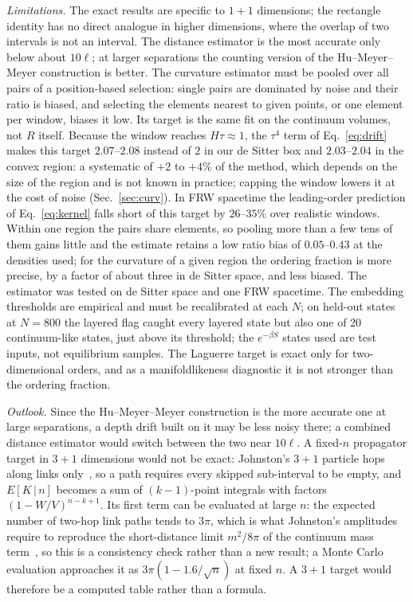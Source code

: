 \documentclass[prd,twocolumn,superscriptaddress,nofootinbib,amsmath,amssymb,floatfix]{revtex4-2}
\begin{document}
\emph{Limitations.} The exact results are specific to $1+1$ dimensions; the rectangle identity has no direct analogue in higher dimensions, where the overlap of two intervals is not an interval. The distance estimator is the most accurate only below about $10\ell$; at larger separations the counting version of the Hu--Meyer--Meyer construction is better. The curvature estimator must be pooled over all pairs of a position-based selection: single pairs are dominated by noise and their ratio is biased, and selecting the elements nearest to given points, or one element per window, biases it low. Its target is the same fit on the continuum volumes, not $R$ itself. Because the window reaches $H\tau\approx1$, the $\tau^4$ term of Eq.~\eqref{eq:drift} makes this target $2.07$--$2.08$ instead of $2$ in our de Sitter box and $2.03$--$2.04$ in the convex region: a systematic of $+2$ to $+4\%$ of the method, which depends on the size of the region and is not known in practice; capping the window lowers it at the cost of noise (Sec.~\ref{sec:curv}). In FRW spacetime the leading-order prediction of Eq.~\eqref{eq:kernel} falls short of this target by $26$--$35\%$ over realistic windows. Within one region the pairs share elements, so pooling more than a few tens of them gains little and the estimate retains a low ratio bias of $0.05$--$0.43$ at the densities used; for the curvature of a given region the ordering fraction is more precise, by a factor of about three in de Sitter space, and less biased. The estimator was tested on de Sitter space and one FRW spacetime. The embedding thresholds are empirical and must be recalibrated at each $N$; on held-out states at $N=800$ the layered flag caught every layered state but also one of 20 continuum-like states, just above its threshold; the $e^{-\beta S}$ states used are test inputs, not equilibrium samples. The Laguerre target is exact only for two-dimensional orders, and as a manifoldlikeness diagnostic it is not stronger than the ordering fraction.

\emph{Outlook.} Since the Hu--Meyer--Meyer construction is the more accurate one at large separations, a depth drift built on it may be less noisy there; a combined distance estimator would switch between the two near $10\ell$. A fixed-$n$ propagator target in $3+1$ dimensions would not be exact: Johnston's $3+1$ particle hops along links only~\cite{Johnston08}, so a path requires every skipped sub-interval to be empty, and $E[K\,|\,n]$ becomes a sum of $(k-1)$-point integrals with factors $(1-W/V)^{n-k+1}$. Its first term can be evaluated at large $n$: the expected number of two-hop link paths tends to $3\pi$, which is what Johnston's amplitudes require to reproduce the short-distance limit $m^2/8\pi$ of the continuum mass term~\cite{Johnston08}, so this is a consistency check rather than a new result; a Monte Carlo evaluation approaches it as $3\pi(1-1.6/\sqrt n)$ at fixed $n$. A $3+1$ target would therefore be a computed table rather than a formula.
\end{document}

